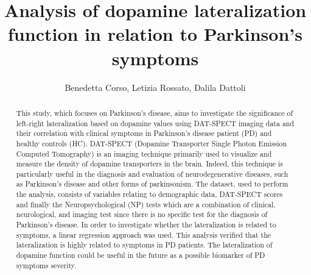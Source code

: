 \documentclass[]{article}
\title{Analysis of dopamine lateralization function in relation to Parkinson's symptoms}
\author{Benedetta Corso, Letizia Rossato, Dalila Dattoli}
\begin{document}
\maketitle

\begin{abstract}
This study, which focuses on Parkinson's disease, aims to investigate the significance of left-right lateralization based on dopamine values using DAT-SPECT imaging data and their correlation with clinical symptoms in Parkinson’s disease patient (PD) and healthy controls (HC). DAT-SPECT (Dopamine Transporter Single Photon Emission Computed Tomography) is an imaging technique primarily used to visualize and measure the density of dopamine transporters in the brain.  Indeed, this technique is particularly useful in the diagnosis and evaluation of neurodegenerative diseases, such as Parkinson's disease and other forms of parkinsonism. The dataset, used to perform the analysis, consists of variables relating to demographic data, DAT-SPECT scores and finally the Neuropsychological (NP) tests which are a combination of clinical, neurological, and imaging test since there is no specific test for the diagnosis of Parkinson’s disease. In order to investigate whether the lateralization is related to symptoms, a linear regression approach was used. This analysis verified that the lateralization is highly related to symptoms in PD patients.
The lateralization of dopamine function could be useful in the future as a possible biomarker of PD symptoms severity.
\newline

\end{abstract}
\end{document}
